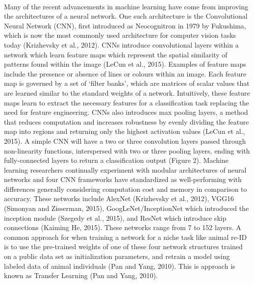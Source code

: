 \documentclass[11pt]{article}
\begin{document}
\newline
\\
Many of the recent advancements in machine learning have come from improving the architectures of a neural network. One such architecture is the Convolutional Neural Network (CNN), first introduced as Neocognitron in 1979 by Fukushima, which is now the most commonly used architecture for computer vision tasks today (Krizhevsky et al., 2012). CNNs introduce convolutional layers within a network which learn feature maps which represent the spatial similarity of patterns found within the image (LeCun et al., 2015). Examples of feature maps include the presence or absence of lines or colours within an image. Each feature map is governed by a set of `filter banks', which are matrices of scalar values that are learned similar to the standard weights of a network. Intuitively, these feature maps learn to extract the necessary features for a classification task replacing the need for feature engineering. CNNs also introduces max pooling layers, a method that reduces computation and increases robustness by evenly dividing the feature map into regions and returning only the highest activation values (LeCun et al., 2015). A simple CNN will have a two or three convolution layers passed through non-linearity functions, interspersed with two or three pooling layers, ending with fully-connected layers to return a classification output (Figure 2). Machine learning researchers continually experiment with modular architectures of neural networks and four CNN frameworks have standardized as well-performing with differences generally considering computation cost and memory in comparison to accuracy. These networks include AlexNet (Krizhevsky et al., 2012), VGG16 (Simonyan and Zisserman, 2015), GoogLeNet/InceptionNet which introduced the inception module (Szegedy et al., 2015), and ResNet which introduce skip connections (Kaiming He, 2015). These networks range from 7 to 152 layers. A common approach for when training a network for a niche task like animal re-ID is to use the pre-trained weights of one of these four network structures trained on a public data set as initialization parameters, and retrain a model using labeled data of animal individuals (Pan and Yang, 2010). This is approach is known as Transfer Learning (Pan and Yang, 2010).
\newline
\\
\end{document}
